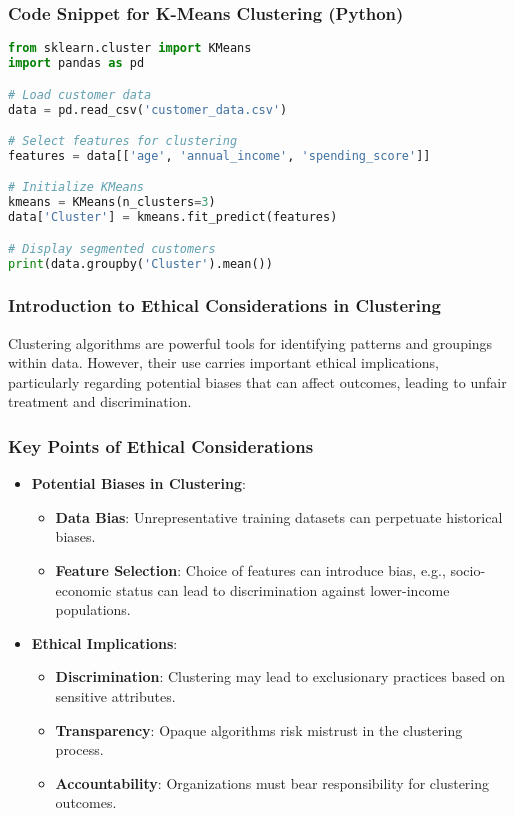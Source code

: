 \documentclass[aspectratio=169]{beamer}
\begin{document}
\begin{frame}[fragile]
    \frametitle{Code Snippet for K-Means Clustering (Python)}
    \begin{lstlisting}[language=Python]
from sklearn.cluster import KMeans
import pandas as pd

# Load customer data
data = pd.read_csv('customer_data.csv')

# Select features for clustering
features = data[['age', 'annual_income', 'spending_score']]

# Initialize KMeans
kmeans = KMeans(n_clusters=3)
data['Cluster'] = kmeans.fit_predict(features)

# Display segmented customers
print(data.groupby('Cluster').mean())
    \end{lstlisting}
\end{frame}

\begin{frame}[fragile]
    \frametitle{Introduction to Ethical Considerations in Clustering}
    Clustering algorithms are powerful tools for identifying patterns and groupings within data. However, their use carries important ethical implications, particularly regarding potential biases that can affect outcomes, leading to unfair treatment and discrimination.
\end{frame}

\begin{frame}[fragile]
    \frametitle{Key Points of Ethical Considerations}
    \begin{itemize}
        \item \textbf{Potential Biases in Clustering}:
        \begin{itemize}
            \item \textbf{Data Bias}: Unrepresentative training datasets can perpetuate historical biases. 
            \item \textbf{Feature Selection}: Choice of features can introduce bias, e.g., socio-economic status can lead to discrimination against lower-income populations.
        \end{itemize}
        \item \textbf{Ethical Implications}:
        \begin{itemize}
            \item \textbf{Discrimination}: Clustering may lead to exclusionary practices based on sensitive attributes.
            \item \textbf{Transparency}: Opaque algorithms risk mistrust in the clustering process.
            \item \textbf{Accountability}: Organizations must bear responsibility for clustering outcomes.
        \end{itemize}
    \end{itemize}
\end{frame}
\end{document}

